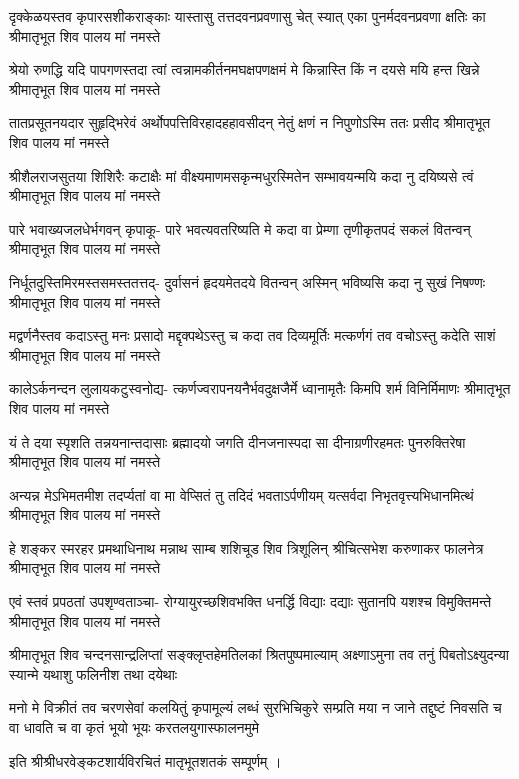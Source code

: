 \fourlineindentedshloka
{दृक्केळयस्तव कृपारसशीकराङ्काः}
{यास्तासु तत्तदवनप्रवणासु चेत् स्यात्}
{एका पुनर्मदवनप्रवणा क्षतिः का}
{श्रीमातृभूत शिव पालय मां नमस्ते} %

\fourlineindentedshloka
{श्रेयो रुणद्धि यदि पापगणस्तदा त्वां}
{त्वन्नामकीर्तनमघक्षपणक्षमं मे}
{किन्नास्ति किं न दयसे मयि हन्त खिन्ने}
{श्रीमातृभूत शिव पालय मां नमस्ते} %

\fourlineindentedshloka
{तातप्रसूतनयदार सुहृद्भिरेवं}
{अर्थोपपत्तिविरहादहहावसीदन्}
{नेतुं क्षणं न निपुणोऽस्मि ततः प्रसीद}
{श्रीमातृभूत शिव पालय मां नमस्ते} %

\fourlineindentedshloka
{श्रीशैलराजसुतया शिशिरैः कटाक्षैः}
{मां वीक्ष्यमाणमसकृन्मधुरस्मितेन}
{सम्भावयन्मयि कदा नु दयिष्यसे त्वं}
{श्रीमातृभूत शिव पालय मां नमस्ते} %

\fourlineindentedshloka
{पारे भवाख्यजलधेर्भगवन् कृपाकू-}
{पारे भवत्यवतरिष्यति मे कदा वा}
{प्रेम्णा तृणीकृतपदं सकलं वितन्वन्}
{श्रीमातृभूत शिव पालय मां नमस्ते} %

\fourlineindentedshloka
{निर्धूतदुस्तिमिरमस्तसमस्ततत्तद्-}
{दुर्वासनं हृदयमेतदये वितन्वन्}
{अस्मिन् भविष्यसि कदा नु सुखं निषण्णः}
{श्रीमातृभूत शिव पालय मां नमस्ते} %

\fourlineindentedshloka
{मद्वर्णनैस्तव कदाऽस्तु मनः प्रसादो}
{मद्दृक्पथेऽस्तु च कदा तव दिव्यमूर्तिः}
{मत्कर्णगं तव वचोऽस्तु कदेति साशं}
{श्रीमातृभूत शिव पालय मां नमस्ते} %

\fourlineindentedshloka
{कालेऽर्कनन्दन लुलायकटुस्वनोद्य-}
{त्कर्णज्वरापनयनैर्भवदुक्षजैर्मे}
{ध्वानामृतैः किमपि शर्म विनिर्मिमाणः}
{श्रीमातृभूत शिव पालय मां नमस्ते} %

\fourlineindentedshloka
{यं ते दया स्पृशति तन्नयनान्तदासाः}
{ब्रह्मादयो जगति दीनजनास्पदा सा}
{दीनाग्रणीरहमतः पुनरुक्तिरेषा}
{श्रीमातृभूत शिव पालय मां नमस्ते} %

\fourlineindentedshloka
{अन्यन्न मेऽभिमतमीश तदर्प्यतां वा}
{मा वेप्सितं तु तदिदं भवताऽर्पणीयम्}
{यत्सर्वदा निभृतवृत्त्यभिधानमित्थं}
{श्रीमातृभूत शिव पालय मां नमस्ते} %

\fourlineindentedshloka
{हे शङ्कर स्मरहर प्रमथाधिनाथ}
{मन्नाथ साम्ब शशिचूड शिव त्रिशूलिन्}
{श्रीचित्सभेश करुणाकर फालनेत्र}
{श्रीमातृभूत शिव पालय मां नमस्ते} %

\fourlineindentedshloka
{एवं स्तवं प्रपठतां उपश‍ृण्वताञ्चा-}
{रोग्यायुरच्छशिवभक्ति धनर्द्धि विद्याः}
{दद्याः सुतानपि यशश्च विमुक्तिमन्ते}
{श्रीमातृभूत शिव पालय मां नमस्ते} %

\fourlineindentedshloka
{श्रीमातृभूत शिव चन्दनसान्द्रलिप्तां}
{सङ्क्लृप्तहेमतिलकां श्रितपुष्पमाल्याम्}
{अक्ष्णाऽमुना तव तनुं पिबतोऽक्ष्युदन्या}
{स्यान्मे यथाशु फलिनीश तथा दयेथाः} %

\fourlineindentedshloka
{मनो मे विक्रीतं तव चरणसेवां कलयितुं}
{कृपामूल्यं लब्धं सुरभिचिकुरे सम्प्रति मया}
{न जाने तद्दुष्टं निवसति च वा धावति च वा}
{कृतं भूयो भूयः करतलयुगास्फालनमुमे} %

इति श्रीश्रीधरवेङ्कटशार्यविरचितं मातृभूतशतकं सम्पूर्णम् ।